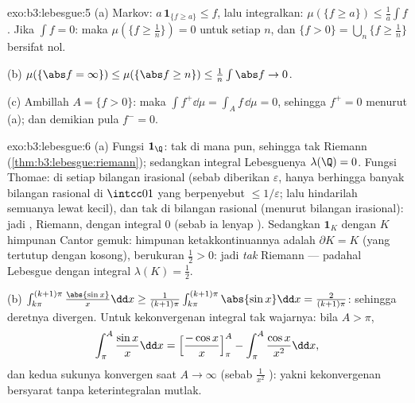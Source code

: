 \begin{solution}{exo:b3:lebesgue:5}
(a) Markov: $a\,\mathbf 1_{\{f \geq a\}} \leq f$, lalu integralkan:
$\mu(\{f \geq a\}) \leq \frac1a\int f$. Jika $\int f = 0$: maka
$\mu(\{f \geq \frac1n\}) = 0$ untuk setiap $n$, dan $\{f > 0\} =
\bigcup_n\{f \geq \frac1n\}$ bersifat nol.

(b) $\mu(\{\abs f = \infty\}) \leq \mu(\{\abs f \geq n\}) \leq
\frac1n\int\abs f \to 0$.

(c) Ambillah $A = \{f > 0\}$: maka $\int f^+\dd\mu = \int_Af\,\dd\mu =
0$, sehingga $f^+ = 0$  menurut (a); dan demikian pula $f^- = 0$.
\end{solution}

\begin{solution}{exo:b3:lebesgue:6}
(a) Fungsi $\mathbf 1_\Q$: tak  di mana pun, sehingga tak
 Riemann (\cref{thm:b3:lebesgue:riemann}); sedangkan
integral Lebesguenya $\lambda(\Q) = 0$. Fungsi Thomae:  di
setiap bilangan irasional (sebab diberikan $\varepsilon$, hanya berhingga banyak
bilangan rasional di $\intcc01$ yang berpenyebut $\leq
1/\varepsilon$; lalu hindarilah semuanya lewat  kecil),
dan tak  di bilangan rasional (menurut  bilangan irasional): jadi 
,  Riemann, dengan integral $0$ (sebab ia lenyap ).
Sedangkan $\mathbf 1_K$ dengan $K$ himpunan Cantor gemuk: himpunan ketakkontinuannya
adalah $\partial K = K$ (yang tertutup dengan  kosong), berukuran
$\frac12 > 0$: jadi \emph{tak}  Riemann --- padahal
 Lebesgue dengan integral $\lambda(K) = \frac12$.

(b) $\int_{k\pi}^{(k+1)\pi}\frac{\abs{\sin x}}x\dd x \geq
\frac1{(k+1)\pi}\int_{k\pi}^{(k+1)\pi}\abs{\sin x}\dd x =
\frac{2}{(k+1)\pi}$: sehingga deretnya divergen. Untuk kekonvergenan
integral tak wajarnya: bila $A > \pi$,
\[
\int_\pi^A\frac{\sin x}x\dd x = \Bigl[\frac{-\cos
x}x\Bigr]_\pi^A - \int_\pi^A\frac{\cos x}{x^2}\dd x,
\]
dan kedua sukunya konvergen saat $A \to \infty$ (sebab $\frac1{x^2}$
): yakni kekonvergenan bersyarat tanpa keterintegralan
mutlak.
\end{solution}

